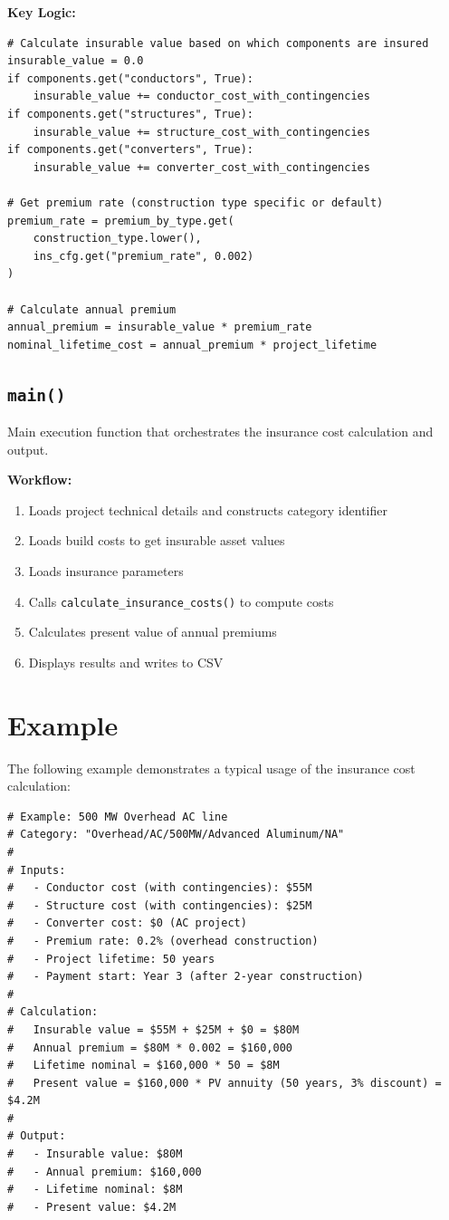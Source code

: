 \documentclass[12pt]{article}
\begin{document}
\textbf{Key Logic:}
\begin{lstlisting}
# Calculate insurable value based on which components are insured
insurable_value = 0.0
if components.get("conductors", True):
    insurable_value += conductor_cost_with_contingencies
if components.get("structures", True):
    insurable_value += structure_cost_with_contingencies
if components.get("converters", True):
    insurable_value += converter_cost_with_contingencies

# Get premium rate (construction type specific or default)
premium_rate = premium_by_type.get(
    construction_type.lower(), 
    ins_cfg.get("premium_rate", 0.002)
)

# Calculate annual premium
annual_premium = insurable_value * premium_rate
nominal_lifetime_cost = annual_premium * project_lifetime
\end{lstlisting}

\subsection{\texttt{main()}}

Main execution function that orchestrates the insurance cost calculation and output.

\textbf{Workflow:}
\begin{enumerate}
    \item Loads project technical details and constructs category identifier
    \item Loads build costs to get insurable asset values
    \item Loads insurance parameters
    \item Calls \texttt{calculate\_insurance\_costs()} to compute costs
    \item Calculates present value of annual premiums
    \item Displays results and writes to CSV
\end{enumerate}

\section{Example}

The following example demonstrates a typical usage of the insurance cost calculation:

\begin{lstlisting}
# Example: 500 MW Overhead AC line
# Category: "Overhead/AC/500MW/Advanced Aluminum/NA"
# 
# Inputs:
#   - Conductor cost (with contingencies): $55M
#   - Structure cost (with contingencies): $25M
#   - Converter cost: $0 (AC project)
#   - Premium rate: 0.2% (overhead construction)
#   - Project lifetime: 50 years
#   - Payment start: Year 3 (after 2-year construction)
#
# Calculation:
#   Insurable value = $55M + $25M + $0 = $80M
#   Annual premium = $80M * 0.002 = $160,000
#   Lifetime nominal = $160,000 * 50 = $8M
#   Present value = $160,000 * PV annuity (50 years, 3% discount) = $4.2M
#
# Output:
#   - Insurable value: $80M
#   - Annual premium: $160,000
#   - Lifetime nominal: $8M
#   - Present value: $4.2M
\end{lstlisting}
\end{document}
